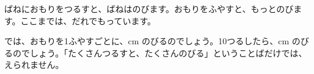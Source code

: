 \newcommand\bkthraitem[1]{\par\noindent\hangindent=1\zw\hangafter=1 ・#1\par}
\newcommand\bkthrapill[1]{\bk@pill{#1}}
\newcommand\bkthratalk[4]{%
  \bkChar{#2}{(7,#1-6.5)}{12mm}
  \node[rectangle callout, callout absolute pointer={(15.5,#1)}, anchor=west, draw=bkTheme, line width=0.8pt,
    fill=white, rounded corners=2.5mm, inner xsep=3mm, inner ysep=1.8mm, text width=103mm, align=left,
    font=\small] at (21,#1) {#4};
  \node[anchor=north, font=\sffamily\scriptsize, text=bkGray, inner sep=0pt] at (7,#1-7.5) {#3};}
\newcommand\bkthrastep[3]{%
  \node[draw=bkTheme, line width=1pt, fill=white, rounded corners=2mm, minimum width=21mm, minimum height=30mm, inner sep=0pt] (#1) at (#2,0) {};
  \node[anchor=north, font=\sffamily\bfseries\footnotesize, text=bkDeep, inner sep=0pt] at (#2,13) {#3};}
\newcommand\bk@icon@bkthraroute{%
  \draw[bkOn, line width=0.13*\bk@iu, line cap=round] (-0.62,0) -- (0.62,0);
  \filldraw[fill=white, draw=bkOn, line width=0.09*\bk@iu] (-0.36,0) circle (0.2) (0.36,0) circle (0.2);}
\makeatother


\noindent ばねにおもりをつるすと、ばねはのびます。おもりをふやすと、もっとのびます。ここまでは、だれでもっています。

では、おもりを1ふやすごとに、cm のびるのでしょう。10つるしたら、cm のびるのでしょう。「たくさんつるすと、たくさんのびる」ということばだけでは、えられません。

